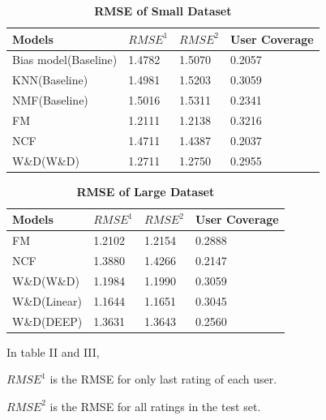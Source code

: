 \documentclass[journal]{IEEEtran}
\begin{document}
\begin{table}[!ht] %
\centering
\label{table:Exps}
\begin{tabular}{llll}
Models                  & $RMSE^1$  & $RMSE^2$  & User Coverage \\ \hline
Bias model(Baseline)    & 1.4782    & 1.5070    & 0.2057        \\
KNN(Baseline)           & 1.4981    & 1.5203    & 0.3059        \\
NMF(Baseline)           & 1.5016    & 1.5311    & 0.2341        \\
FM                      & 1.2111    & 1.2138    & 0.3216        \\
NCF                     & 1.4711    & 1.4387    & 0.2037        \\
W\&D(W\&D)              & 1.2711    & 1.2750    & 0.2955        \\
\end{tabular}
\caption{{\bf RMSE of Small Dataset}}
\end{table}


\begin{table}[!ht] %
\centering
\label{table:Exps}
\begin{tabular}{llll}
Models      &  $RMSE^1$     & $RMSE^2$  &User Coverage \\ \hline
FM            & 1.2102      & 1.2154    & 0.2888    \\
NCF           & 1.3880      & 1.4266    & 0.2147    \\
W\&D(W\&D)    & 1.1984      & 1.1990    & 0.3059    \\
W\&D(Linear)  & 1.1644      & 1.1651    & 0.3045    \\
W\&D(DEEP)    & 1.3631      & 1.3643    & 0.2560    \\
\end{tabular}
\caption{{\bf RMSE of Large Dataset}}
\begin{tablenotes}
      \small
      \item In table II and III,
      \item $RMSE^1$ is the RMSE for only last rating of each user. 
      \item $RMSE^2$ is the RMSE for all ratings in the test set.
\end{tablenotes}
\end{table}

\end{document}
